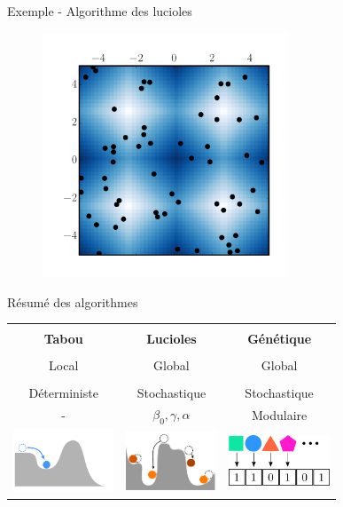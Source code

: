 \documentclass{beamer}
\begin{document}
\begin{frame}{Exemple - Algorithme des lucioles}
\begin{figure}[h!]
    \centering
    \href{run:figures/lines.mp4}{\includegraphics[width=0.65\textwidth]{figures/fireflyout1.pdf}}
  \end{figure}
\end{frame}



\begin{frame}{Résumé des algorithmes}
\begin{table}[h!]
  \centering
  \begin{tabular}{ccc}
  \hline\\
  \textbf{Tabou} & \textbf{Lucioles} & \textbf{Génétique}\\
  \hline\\

  Local & Global & Global\\\\
  Déterministe & Stochastique & Stochastique\\
    - & $\beta_0,\gamma,\alpha$ & Modulaire \\
  \includegraphics[width=3cm]{figures/tabou2v2.pdf}& \includegraphics[width=2.7cm]{figures/firefly2_v2.pdf} & \includegraphics[width=3cm]{figures/bitString.pdf} \\
  \hline
  \end{tabular}
\end{table}
  
\end{frame} 
\end{document}
